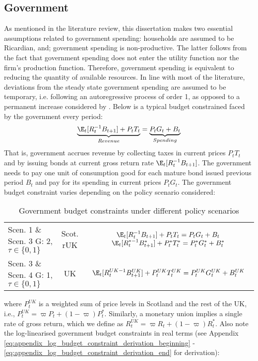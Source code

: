 \subsection{Government}

As mentioned in the literature review, this dissertation makes two essential assumptions related to government spending: households are assumed to be Ricardian, and; government spending is non-productive. The latter follows from the fact that government spending does not enter the utility function nor the firm's production function. Therefore, government spending is equivalent to reducing the quantity of available resources. In line with most of the literature, deviations from the steady state government spending are assumed to be temporary, i.e. following an autoregressive process of order 1, as opposed to a permanent increase considered by \textcite{baxter_1993_fiscal}. Below is a typical budget constrained faced by the government every period:
\begin{align}
    \underbrace{\E_t [R^{-1}_tB_{t+1}] + P_t T_t}_{Revenue} = \underbrace{P_tG_t + B_t}_{Spending}
\end{align}
That is, government accrues revenue by collecting taxes in current prices $P_t T_t$ and by issuing bonds at current gross return rate $\E_t [R^{-1}_tB_{t+1}]$. The government needs to pay one unit of consumption good for each mature bond issued previous period $B_t$ and pay for its spending in current prices $P_t G_t$. The government budget constraint varies depending on the policy scenario considered:
\begin{table}[H]
    \renewcommand{\arraystretch}{2}
    \centering
    \begin{tabular}{l|c|c}
    \makecell{Scen. 1 \& Scen. 3\\ G: 2, $\tau \in \{0, 1\}$} & \makecell{Scot. \\ rUK } & 
        \makecell{
            $\E_t [R^{-1}_tB_{t+1}] + P_t T_t = P_tG_t + B_t$\\
            $\E_t [{R^{*-1}_{t}}B^*_{t+1}] + P^*_tT^*_t = P^*_tG^*_t + B^*_t$
        }  \\ 
    \makecell{Scen. 3 \& Scen. 4\\ G: 1, $\tau \in \{0, 1\}$} & UK & 
    $\E_t [{R^{UK-1}_{t}}B^{UK}_{t+1}] + P^{UK}_tT^{UK}_t = P^{UK}_tG^{UK}_t + B^{UK}_t$
    \end{tabular}
    \caption{Government budget constraints under different policy scenarios}
\end{table}
where $P^{UK}_t$ is a weighted sum of price levels in Scotland and the rest of the UK, i.e., $P^{UK}_t = \varpi P_t + (1-\varpi)P^*_t$. Similarly, a monetary union implies a single rate of gross return, which we define as $R^{UK}_t = \varpi R_t + (1-\varpi)R^*_t$. Also note the log-linearised government budget constraints in real terms (see Appendix \ref{eq:appendix_log_budget_constraint_derivation_beginning} - \ref{eq:appendix_log_budget_constraint_derivation_end} for derivation):
